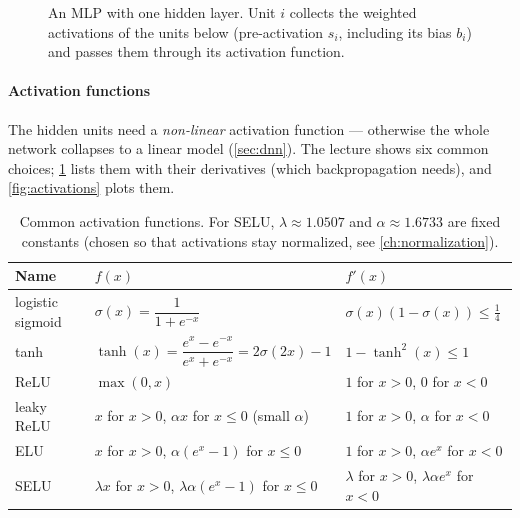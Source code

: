 \documentclass[11pt, oneside]{book}
\begin{document}
\begin{figure}[htbp]
\centering
{}
\caption{An MLP with one hidden layer. Unit $i$ collects the weighted
activations of the units below (pre-activation $s_i$, including its bias
$b_i$) and passes them through its activation function.}
\label{fig:mlp}
\end{figure}

\paragraph{Activation functions}
The hidden units need a \emph{non-linear} activation function --- otherwise
the whole network collapses to a linear model (\cref{sec:dnn}). The lecture
shows six common choices; \cref{tab:activations} lists them with their
derivatives (which backpropagation needs), and \cref{fig:activations}
plots them.

\begin{table}[htbp]
\centering
\small
\renewcommand{\arraystretch}{1.25}
\begin{tabular}{@{}lll@{}}
\toprule
\textbf{Name} & $f(x)$ & $f'(x)$ \\
\midrule
logistic sigmoid & $\sigma(x) = \dfrac{1}{1+e^{-x}}$ & $\sigma(x)(1-\sigma(x)) \le \tfrac14$ \\
tanh & $\tanh(x) = \dfrac{e^x - e^{-x}}{e^x + e^{-x}} = 2\sigma(2x) - 1$ & $1 - \tanh^2(x) \le 1$ \\
ReLU & $\max(0, x)$ & $1$ for $x > 0$, $0$ for $x < 0$ \\
leaky ReLU & $x$ for $x > 0$, $\alpha x$ for $x \le 0$ (small $\alpha$) & $1$ for $x > 0$, $\alpha$ for $x < 0$ \\
ELU & $x$ for $x > 0$, $\alpha(e^x - 1)$ for $x \le 0$ & $1$ for $x > 0$, $\alpha e^x$ for $x < 0$ \\
SELU & $\lambda x$ for $x > 0$, $\lambda\alpha(e^x - 1)$ for $x \le 0$ & $\lambda$ for $x > 0$, $\lambda\alpha e^x$ for $x < 0$ \\
\bottomrule
\end{tabular}
\caption{Common activation functions. For SELU, $\lambda \approx 1.0507$ and
$\alpha \approx 1.6733$ are fixed constants (chosen so that activations stay
normalized, see \cref{ch:normalization}).}
\label{tab:activations}
\end{table}
\end{document}
